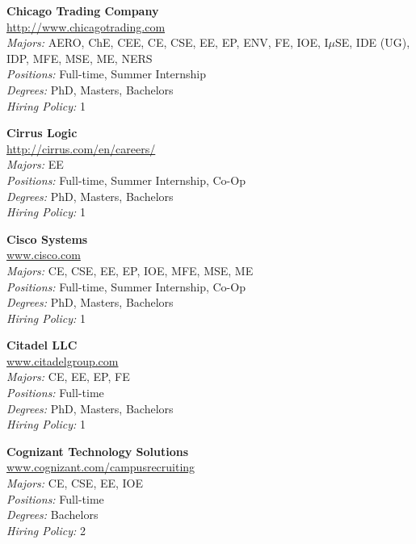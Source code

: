 \documentclass[twoside]{article}
\begin{document}
\begin{center}
\begin{multicols}{3}
\begin{minipage}{.9\columnwidth}{\Large\bf Chicago Trading Company }\\
	\url{http://www.chicagotrading.com}\\
	\emph{Majors:} AERO, ChE, CEE, CE, CSE, EE, EP, ENV, FE, IOE, I$\mu$SE, IDE (UG), IDP, MFE, MSE, ME, NERS\\
	\emph{Positions:} Full-time, Summer Internship\\
	\emph{Degrees:} PhD, Masters, Bachelors\\
	\emph{Hiring Policy:} 1\\
\end{minipage}
 
\begin{minipage}{.9\columnwidth}{\Large\bf Cirrus Logic }\\
	\url{http://cirrus.com/en/careers/}\\
	\emph{Majors:} EE\\
	\emph{Positions:} Full-time, Summer Internship, Co-Op\\
	\emph{Degrees:} PhD, Masters, Bachelors\\
	\emph{Hiring Policy:} 1\\
\end{minipage}
 
\begin{minipage}{.9\columnwidth}{\Large\bf Cisco Systems }\\
	\url{www.cisco.com}\\
	\emph{Majors:} CE, CSE, EE, EP, IOE, MFE, MSE, ME\\
	\emph{Positions:} Full-time, Summer Internship, Co-Op\\
	\emph{Degrees:} PhD, Masters, Bachelors\\
	\emph{Hiring Policy:} 1\\
\end{minipage}
 
\begin{minipage}{.9\columnwidth}{\Large\bf Citadel LLC }\\
	\url{www.citadelgroup.com}\\
	\emph{Majors:} CE, EE, EP, FE\\
	\emph{Positions:} Full-time\\
	\emph{Degrees:} PhD, Masters, Bachelors\\
	\emph{Hiring Policy:} 1\\
\end{minipage}
 
\begin{minipage}{.9\columnwidth}{\Large\bf Cognizant Technology Solutions }\\
	\url{www.cognizant.com/campusrecruiting}\\
	\emph{Majors:} CE, CSE, EE, IOE\\
	\emph{Positions:} Full-time\\
	\emph{Degrees:} Bachelors\\
	\emph{Hiring Policy:} 2\\
\end{minipage}
 

\end{multicols}
\end{center}
\end{document}
